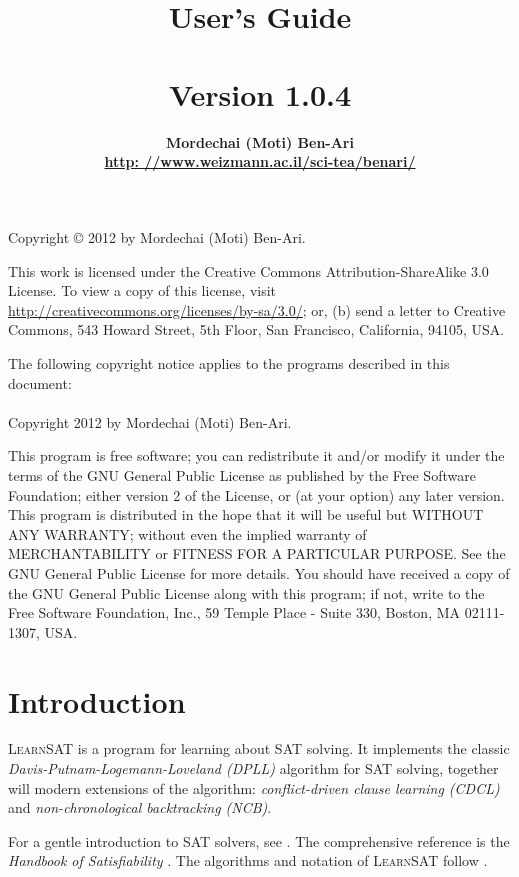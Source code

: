 \documentclass[11pt]{article}
\author{\bfseries Mordechai (Moti) Ben-Ari\\\url{http: //www.weizmann.ac.il/sci-tea/benari/}}
\title{\bfseries \ls\\\mbox{}\\
\bfseries\large User's Guide\\\mbox{}\\
\bfseries\normalsize Version 1.0.4}
\newcommand*{\ls}{\textsc{LearnSAT}}
\begin{document}
\maketitle
\thispagestyle{empty}

\vfill

\begin{center}
Copyright \copyright{} 2012 by Mordechai (Moti) Ben-Ari.
\end{center}
This work is licensed under the Creative Commons Attribution-ShareAlike 3.0
License. To view a copy of this license, visit
\url{http://creativecommons.org/licenses/by-sa/3.0/}; or, (b) send a letter
to Creative Commons, 543 Howard Street, 5th Floor, San Francisco,
California, 94105, USA.

\bigskip

 
\begin{center}
The following copyright notice applies to the programs described in this
document:\mbox{}\\\mbox{}\\
Copyright 2012 by Mordechai (Moti) Ben-Ari.
\end{center}

This program is free software; you can redistribute it and/or
modify it under the terms of the GNU General Public License
as published by the Free Software Foundation; either version 2
of the License, or (at your option) any later version.
This program is distributed in the hope that it will be useful
but WITHOUT ANY WARRANTY; without even the implied warranty of
MERCHANTABILITY or FITNESS FOR A PARTICULAR PURPOSE.
See the GNU General Public License for more details.
You should have received a copy of the GNU General Public License
along with this program; if not, write to the Free Software
Foundation, Inc., 59 Temple Place - Suite 330, Boston, MA
02111-1307, USA.

\newpage

\section{Introduction}

\ls{} is a program for learning about SAT solving. It implements the
classic \emph{Davis-Putnam-Logemann-Loveland (DPLL)} algorithm for SAT
solving, together will modern extensions of the algorithm:
\emph{conflict-driven clause learning (CDCL)} and
\emph{non-chronological backtracking (NCB)}.

For a gentle introduction to SAT solvers, see \cite[Chapter~6]{mlcs}.
The comprehensive reference is the \emph{Handbook of Satisfiability}
\cite{SAT}. The algorithms and notation of \ls{} follow \cite{mlm}.
\end{document}
